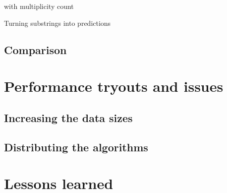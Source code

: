 \documentclass[a4paper,12pt]{article}
\begin{document}
  \begin{algorithm}



     with multiplicity count\;

    \caption{\label{predicting}Turning substrings into predictions}
  \end{algorithm}

  \subsection{Comparison}


  \section{Performance tryouts and issues}\label{tests}

  \subsection{Increasing the data sizes}

  \subsection{Distributing the algorithms}

\section*{Lessons learned}

  \lipsum[8-9]
\end{document}
